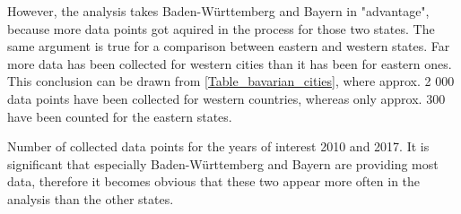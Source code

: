 \documentclass{article}
\begin{document}
	However, the analysis takes Baden-Württemberg and Bayern in "advantage", because more data points got aquired in the process for those two states. The same argument is true for a comparison between eastern and western states. Far more data has been collected for western cities than it has been for eastern ones. This conclusion can be drawn from \cref{Table_bavarian_cities}, where approx. 2 000 data points have been collected for western countries, whereas only approx. 300 have been counted for the eastern states.
	\newpage
		\renewcommand{\arraystretch}{1.3}
		\begin{table}[h!]
			\caption{Number of collected data points for the years of interest 2010 and 2017. It is significant that especially Baden-Württemberg and Bayern are providing most data, therefore it becomes obvious that these two appear more often in the analysis than the other states.}
			\label{Table_bavarian_cities}
			\centering
			
		\end{table}
	\label{outlook}

\end{document}
